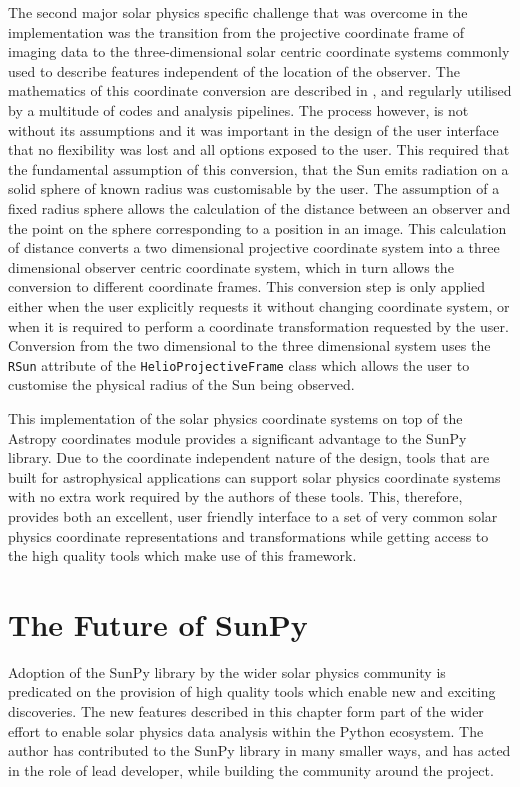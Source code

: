 The second major solar physics specific challenge that was overcome in the implementation was the transition from the projective coordinate frame of imaging data to the three-dimensional solar centric coordinate systems commonly used to describe features independent of the location of the observer.
The mathematics of this coordinate conversion are described in \cite{thompson2006}, and regularly utilised by a multitude of codes and analysis pipelines.
The process however, is not without its assumptions and it was important in the design of the user interface that no flexibility was lost and all options exposed to the user.
This required that the fundamental assumption of this conversion, that the Sun emits radiation on a solid sphere of known radius was customisable by the user.
The assumption of a fixed radius sphere allows the calculation of the distance between an observer and the point on the sphere corresponding to a position in an image.
This calculation of distance converts a two dimensional projective coordinate system into a three dimensional observer centric coordinate system, which in turn allows the conversion to different coordinate frames.
This conversion step is only applied either when the user explicitly requests it without changing coordinate system, or when it is required to perform a coordinate transformation requested by the user.
Conversion from the two dimensional to the three dimensional system uses the \verb|RSun| attribute of the \verb|HelioProjectiveFrame| class which allows the user to customise the physical radius of the Sun being observed.

This implementation of the solar physics coordinate systems on top of the Astropy coordinates module provides a significant advantage to the SunPy library.
Due to the coordinate independent nature of the design, tools that are built for astrophysical applications can support solar physics coordinate systems with no extra work required by the authors of these tools.
This, therefore, provides both an excellent, user friendly interface to a set of very common solar physics coordinate representations and transformations while getting access to the high quality tools which make use of this framework.

\section{The Future of SunPy}

Adoption of the SunPy library by the wider solar physics community is predicated on the provision of high quality tools which enable new and exciting discoveries.
The new features described in this chapter form part of the wider effort to enable solar physics data analysis within the Python ecosystem.
The author has contributed to the SunPy library in many smaller ways, and has acted in the role of lead developer, while building the community around the project.

